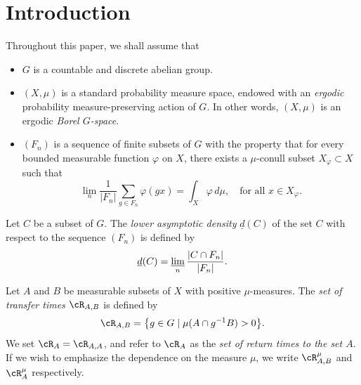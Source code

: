 \vspace*{-1.5\baselineskip}
\vskip0pt\enlargethispage{.5\baselineskip}%
\section{Introduction}

Throughout this paper, we shall assume that
\begin{itemize}
\item $G$ is a countable and discrete abelian group.

\item $(X,\mu)$ is a standard probability measure space, endowed with an \emph{ergodic} probability measure-preserving action of $G$.
In other words, $(X,\mu)$ is an ergodic \emph{Borel $G$-space}.

\item $(F_n)$ is a sequence of finite subsets of $G$ with the property that for every bounded measurable function $\varphi$ on $X$, there
exists a $\mu$-conull subset $X_\varphi \subset X$ such that
\begin{equation}
\label{pointwise}
\lim_n \frac{1}{|F_n|} \sum_{g \in F_n} \varphi(gx) = \int_X \varphi \, d\mu, \quad \textrm{for all $x \in X_\varphi$}.
\end{equation}
\end{itemize}

\begin{definition}
Let $C$ be a subset of $G$. The \emph{lower asymptotic density} $\underline{d}(C)$ of the set $C$ with respect to the sequence $(F_n)$ is defined by
\begin{equation}
\label{def_lad}
\underline{d}(C) = \varliminf_n \frac{|C \cap F_n|}{|F_n|}.
\end{equation}
\end{definition}

\begin{definition}
Let $A$ and $B$ be measurable subsets of $X$ with positive $\mu$-measures. The \emph{set of transfer times $\cR_{A,B}$} is defined by
\begin{equation}
\label{def_RAB}
\cR_{A,B} = \bigl\{ g \in G \mid  \mu(A \cap g^{-1}B) > 0 \bigr\}.
\end{equation}
We set $\cR_A = \cR_{A,A}$, and refer to $\cR_A$ as the \emph{set of return times to the set $A$}. If we wish to emphasize the dependence on
the measure $\mu$, we write $\cR^\mu_{A,B}$ and $\cR^{\mu}_A$ respectively.
\end{definition}

